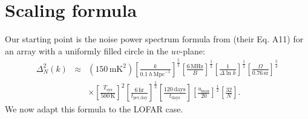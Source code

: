 \documentclass[11pt]{article}
\begin{document}
\section{Scaling formula}
Our starting point is the noise power spectrum formula from \cite{sensitivity} (their Eq. A11) for an array with a uniformly filled circle in the $uv$-plane:
\begin{eqnarray}
\label{PAPERform}
\Delta^2_N (k) \!\!\!\! &\approx& \!\!\!\! (150\,\textrm{mK}^2) \left[ \frac{k}{0.1~h\,\textrm{Mpc}^{-1}}\right]^{\frac{5}{2}} \left[ \frac{6\,\textrm{MHz}}{B}\right]^{\frac{1}{2}} \left[ \frac{1}{\Delta \ln k}\right]^{\frac{1}{2}} \left[ \frac{\Omega}{0.76\,\textrm{sr}}\right]^{\frac{5}{4}} \nonumber \\
&& \times  \left[ \frac{T_\textrm{sys}}{500\,\textrm{K}}\right]^2 \left[ \frac{6\,\textrm{hr}}{t_\textrm{per\_day}} \right]^\frac{1}{2} \left[ \frac{120\,\textrm{days}}{t_\textrm{days}} \right] \left[ \frac{u_\textrm{max}}{20} \right]^{\frac{1}{2}} \left[ \frac{32}{N} \right].
\end{eqnarray}
We now adapt this formula to the LOFAR case.\\
\\
\end{document}
